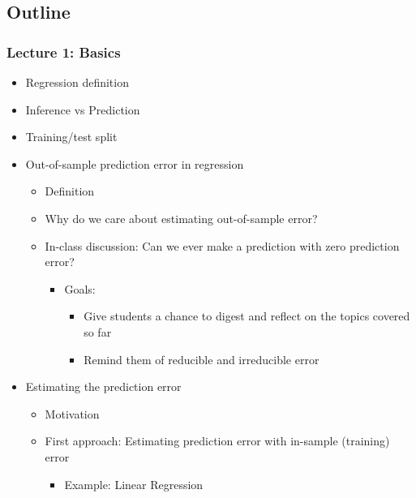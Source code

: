 \documentclass[
  letterpaper,
  DIV=11,
  numbers=noendperiod]{scrartcl}
\providecommand{\tightlist}{%
  \setlength{\itemsep}{0pt}\setlength{\parskip}{0pt}}\usepackage{longtable,booktabs,array}
\begin{document}
\subsection{Outline}\label{outline}

\subsubsection{Lecture 1: Basics}\label{lecture-1-basics}

\begin{itemize}
\tightlist
\item
  Regression definition
\item
  Inference vs Prediction
\item
  Training/test split
\item
  Out-of-sample prediction error in regression

  \begin{itemize}
  \tightlist
  \item
    Definition
  \item
    Why do we care about estimating out-of-sample error?
  \item
    In-class discussion: Can we ever make a prediction with zero
    prediction error?

    \begin{itemize}
    \tightlist
    \item
      Goals:

      \begin{itemize}
      \tightlist
      \item
        Give students a chance to digest and reflect on the topics
        covered so far
      \item
        Remind them of reducible and irreducible error
      \end{itemize}
    \end{itemize}
  \end{itemize}
\item
  Estimating the prediction error

  \begin{itemize}
  \tightlist
  \item
    Motivation
  \item
    First approach: Estimating prediction error with in-sample
    (training) error

    \begin{itemize}
    \tightlist
    \item
      Example: Linear Regression


\end{itemize}
\end{itemize}
\end{itemize}
\end{document}
